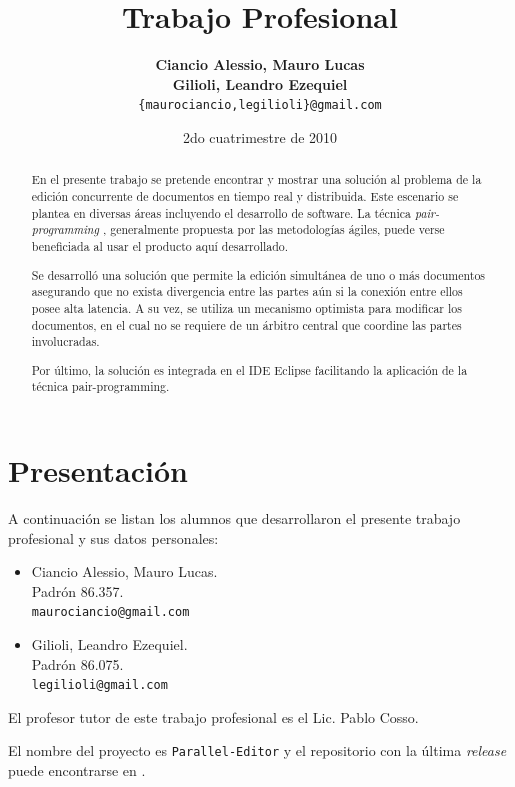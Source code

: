 \documentclass[12pt,a4paper]{article}
\title { \textbf{Trabajo Profesional}}
\date{2do cuatrimestre de 2010}
\author{\textbf{Ciancio Alessio, Mauro Lucas} \\
		\textbf{Gilioli, Leandro Ezequiel}	  \\
		\texttt{\{maurociancio,legilioli\}@gmail.com}
	}
\begin{document}
\maketitle

\begin{abstract}
En el presente trabajo se pretende encontrar y mostrar una solución al problema de
la edición concurrente de documentos en tiempo real y distribuida. Este escenario se plantea en
diversas áreas incluyendo el desarrollo de software. La técnica \textit{pair-programming} \cite{pair-programming},
generalmente propuesta por las metodologías ágiles, puede verse beneficiada al usar 
el producto aquí desarrollado.

Se desarrolló una solución que permite la edición simultánea de uno o más documentos asegurando
que no exista divergencia entre las partes aún si la conexión entre ellos posee alta latencia. A su vez,
se utiliza un mecanismo optimista para modificar los documentos, en el cual no se requiere de un árbitro
central que coordine las partes involucradas.

Por último, la solución es integrada en el IDE Eclipse \cite{eclipse-ide} facilitando la aplicación de la
técnica pair-programming.
\end{abstract}

\newpage
\tableofcontents
\newpage

\section{Presentación}

A continuación se listan los alumnos que desarrollaron el presente trabajo profesional y sus datos personales:

	\begin{itemize}
		\item Ciancio Alessio, Mauro Lucas. \\
		      Padrón 86.357. \\
		      \texttt{maurociancio@gmail.com}
		\item Gilioli, Leandro Ezequiel. \\
		      Padrón 86.075. \\
   		      \texttt{legilioli@gmail.com}
	\end{itemize}

El profesor tutor de este trabajo profesional es el Lic. Pablo Cosso.

El nombre del proyecto es \texttt{Parallel-Editor} y el repositorio con la última \textit{release} puede
encontrarse en \cite{github}.
\end{document}
